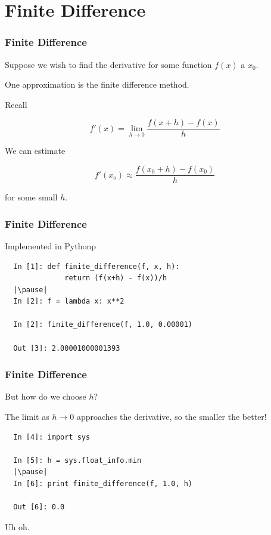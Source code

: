 \documentclass{beamer}
\begin{document}
\section{Finite Difference}

\begin{frame}
\frametitle{Finite Difference}

Suppose we wish to find the derivative for some function $f(x)$ a $x_0$.

\pause
One approximation is the finite difference method.

\pause
Recall

\[ f'(x) = \lim_{h \to 0} \frac{f(x+h)-f(x)}{h} \]

\pause
We can estimate

\[ f'(x_o) \approx \frac{f(x_0+h)-f(x_0)}{h} \]

for some small $h$.



\end{frame}

\begin{frame}[fragile]
\frametitle{Finite Difference}

Implemented in Pythonp


\begin{lstlisting}
  In [1]: def finite_difference(f, x, h):
              return (f(x+h) - f(x))/h
  |\pause|
  In [2]: f = lambda x: x**2

  In [2]: finite_difference(f, 1.0, 0.00001)

  Out [3]: 2.00001000001393
\end{lstlisting}

\end{frame}

\begin{frame}[fragile]
\frametitle{Finite Difference}

But how do we choose $h$? \pause

The limit as $h \to 0$ approaches the derivative, so the smaller the better!

\begin{lstlisting}
  In [4]: import sys

  In [5]: h = sys.float_info.min
  |\pause|
  In [6]: print finite_difference(f, 1.0, h)

  Out [6]: 0.0
\end{lstlisting}


Uh oh.

\end{frame}
\end{document}
